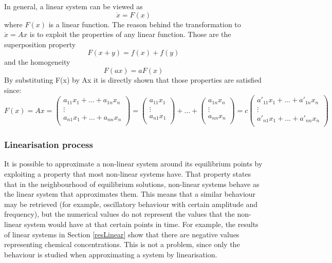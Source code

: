 In general, a linear system can be viewed as
$$ \dot{x} = F(x) $$
where $ F(x) $ is a linear function. The reason behind the transformation to $ \dot{x} = Ax $ is to exploit the properties of any linear function.
Those are the superposition property
$$ F(x + y) = f(x) + f(y) $$
and the homogeneity
$$ F(ax) = aF(x) $$
By substituting F(x) by Ax it is directly shown that those properties are satisfied since:
$$ F(x) = Ax =
\begin{pmatrix}
a_{11}x_1 + \hdots + a_{1n}x_n \\
\vdots \\
a_{n1}x_1 + \hdots + a_{nn}x_n \\
\end{pmatrix}
= \begin{pmatrix}
    a_{11}x_1 \\
    \vdots \\
    a_{n1}x_1 \\
   \end{pmatrix} + \hdots + \begin{pmatrix}
    a_{1n}x_n \\
    \vdots \\
    a_{nn}x_n \\
   \end{pmatrix} = c\begin{pmatrix}
a'_{11}x_1 + \hdots + a'_{1n}x_n \\
\vdots \\
a'_{n1}x_1 + \hdots + a'_{nn}x_n \\
\end{pmatrix}
$$


\subsubsection{Linearisation process}


It is possible to approximate a non-linear system around its equilibrium points by exploiting a property that most non-linear systems have. That property states that in the neighbourhood of equilibrium solutions, non-linear systems behave as the linear system that approximates them. This means that a similar behaviour may be retrieved (for example, oscillatory behaviour with certain amplitude and frequency), but the numerical values do not represent the values that the non-linear system would have at that certain points in time. For example, the results of linear systems in Section \ref{resLinear} show that there are negative values representing chemical concentrations. This is not a problem, since only the behaviour is studied when approximating a system by linearisation.

